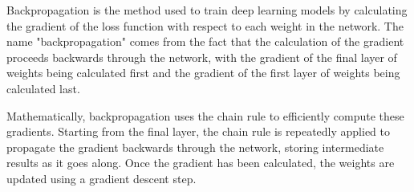 Backpropagation is the method used to train deep learning models by
calculating the gradient of the loss function with respect to each
weight in the network. The name "backpropagation" comes from the fact
that the calculation of the gradient proceeds backwards through the
network, with the gradient of the final layer of weights being
calculated first and the gradient of the first layer of weights being
calculated last.

Mathematically, backpropagation uses the chain rule to efficiently
compute these gradients. Starting from the final layer, the chain rule
is repeatedly applied to propagate the gradient backwards through the
network, storing intermediate results as it goes along. Once the
gradient has been calculated, the weights are updated using a gradient
descent step.
